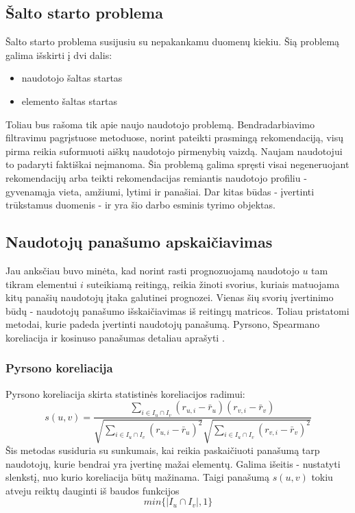 \documentclass{VUMIFInfMagistrinis}
\begin{document}
\subsection{Šalto starto problema}
Šalto starto problema susijusiu su nepakankamu duomenų kiekiu. Šią problemą galima išskirti į dvi dalis:
\begin{itemize}
	\item naudotojo šaltas startas
	\item elemento šaltas startas
\end{itemize}
\indent 
Toliau bus rašoma tik apie naujo naudotojo problemą. Bendradarbiavimo filtravimu pagrįstuose metoduose, norint pateikti prasmingą rekomendaciją, visų pirma reikia suformuoti aiškų naudotojo pirmenybių vaizdą. Naujam naudotojui to padaryti faktiškai neįmanoma. Šia problemą galima spręsti visai negeneruojant rekomendacijų arba teikti rekomendacijas remiantis naudotojo profiliu - gyvenamąja vieta, amžiumi, lytimi ir panašiai. Dar kitas būdas - įvertinti trūkstamus duomenis - ir yra šio darbo esminis tyrimo objektas.
\subsection{Naudotojų panašumo apskaičiavimas}\label{ssec:sim}
Jau anksčiau buvo minėta, kad norint rasti prognozuojamą naudotojo $u$ tam tikram elementui $i$ suteikiamą reitingą, reikia žinoti svorius, kuriais matuojama kitų panašių naudotojų įtaka galutinei prognozei. Vienas šių svorių įvertinimo būdų - naudotojų panašumo išskaičiavimas iš reitingų matricos. Toliau pristatomi metodai, kurie padeda įvertinti naudotojų panašumą. Pyrsono, Spearmano koreliacija ir kosinuso panašumas detaliau aprašyti \cite{2}.
\subsubsection{Pyrsono koreliacija}
Pyrsono koreliacija skirta statistinės koreliacijos radimui:
\begin{equation}
s(u,v) = \frac{\sum \limits_{i\in I_u \cap I_v }(r_{u,i}-\bar{r}_u)(r_{v,i}-\bar{r}_v)}{\sqrt{\sum\limits_{i \in I_u \cap I_v }(r_{u,i} - \bar{r}_u)^2}\sqrt{\sum\limits_{i \in I_u \cap I_v }(r_{v,i} - \bar{r}_v)^2}}
\end{equation}
Šis metodas susiduria su sunkumais, kai reikia paskaičiuoti panašumą tarp naudotojų, kurie bendrai yra įvertinę mažai elementų. Galima išeitis - nustatyti slenkstį, nuo kurio koreliacija būtų mažinama. Taigi panašumą $s(u,v)$ tokiu atveju reiktų dauginti iš baudos funkcijos 
\begin{equation}
min\{|I_u \cap I_v|, 1\}
\end{equation}
\end{document}

